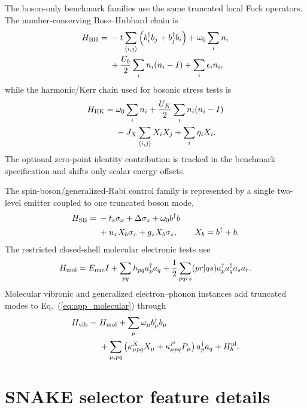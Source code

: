 \documentclass[
  reprint,
  amsmath,
  amssymb,
  aps,
  pra,
  nofootinbib,
  superscriptaddress,
  floatfix
]{revtex4-2}
\begin{document}
The boson-only benchmark families use the same truncated local Fock operators. The number-conserving Bose--Hubbard chain is
\begin{align}
H_{\rm BH}={}&
-t\sum_{\langle i,j\rangle}
\left(b_i^\dagger b_j+b_j^\dagger b_i\right)
+\omega_0\sum_i n_i
\nonumber\\
&
+\frac{U_b}{2}\sum_i n_i(n_i-I)
+\sum_i\epsilon_i n_i ,
\label{eq:app_bose_hubbard}
\end{align}
while the harmonic/Kerr chain used for bosonic stress tests is
\begin{align}
H_{\rm HK}={}&
\omega_0\sum_i n_i
+\frac{U_K}{2}\sum_i n_i(n_i-I)
\nonumber\\
&
-J_X\sum_{\langle i,j\rangle}X_iX_j
+\sum_i\eta_iX_i .
\label{eq:app_harmonic_kerr}
\end{align}
The optional zero-point identity contribution is tracked in the benchmark specification and shifts only scalar energy offsets.

The spin-boson/generalized-Rabi control family is represented by a single two-level emitter coupled to one truncated boson mode,
\begin{align}
H_{\rm SB}={}&
-t_s\sigma_x+\Delta\sigma_z
+\omega_0 b^\dagger b
\nonumber\\
&
+u_xX_b\sigma_x
+g_zX_b\sigma_z,
\qquad X_b=b^\dagger+b .
\label{eq:app_spin_boson}
\end{align}
The restricted closed-shell molecular electronic tests use
\begin{equation}
H_{\rm mol}=E_{\rm nuc}I
+\sum_{pq}h_{pq}a_p^\dagger a_q
+\frac12\sum_{pqrs}(pr|qs)
a_p^\dagger a_q^\dagger a_s a_r .
\label{eq:app_molecular}
\end{equation}
Molecular vibronic and generalized electron--phonon instances add truncated modes to Eq.~(\ref{eq:app_molecular}) through
\begin{align}
H_{\rm vib}={}&H_{\rm mol}
+\sum_\mu\omega_\mu b_\mu^\dagger b_\mu
\nonumber\\
&
+\sum_{\mu,pq}
\left(\kappa^X_{\mu pq}X_\mu+\kappa^P_{\mu pq}P_\mu\right)
a_p^\dagger a_q
+H_b^{\rm nl}.
\label{eq:app_vibronic}
\end{align}

\section{SNAKE selector feature details}
\label{app:static_controller_details}
\end{document}
